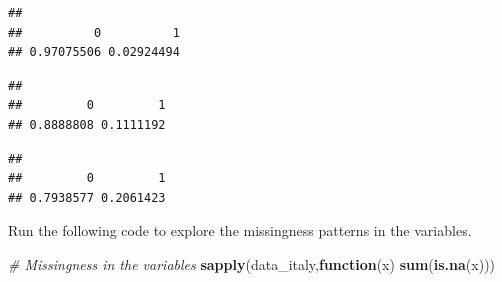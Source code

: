 \documentclass[]{article}
\newenvironment{Shaded}{\begin{snugshade}}{\end{snugshade}}
\newcommand{\CommentTok}[1]{\textcolor[rgb]{0.56,0.35,0.01}{\textit{#1}}}
\newcommand{\ControlFlowTok}[1]{\textcolor[rgb]{0.13,0.29,0.53}{\textbf{#1}}}
\newcommand{\KeywordTok}[1]{\textcolor[rgb]{0.13,0.29,0.53}{\textbf{#1}}}
\newcommand{\NormalTok}[1]{#1}
\newcommand{\OperatorTok}[1]{\textcolor[rgb]{0.81,0.36,0.00}{\textbf{#1}}}
\newcommand{\StringTok}[1]{\textcolor[rgb]{0.31,0.60,0.02}{#1}}
\begin{document}
\begin{Shaded}
\end{Shaded}

\begin{verbatim}
## 
##          0          1 
## 0.97075506 0.02924494
\end{verbatim}

\begin{Shaded}
\end{Shaded}

\begin{verbatim}
## 
##         0         1 
## 0.8888808 0.1111192
\end{verbatim}

\begin{Shaded}
\end{Shaded}

\begin{verbatim}
## 
##         0         1 
## 0.7938577 0.2061423
\end{verbatim}

Run the following code to explore the missingness patterns in the
variables.

\begin{Shaded}
\begin{Highlighting}[]
\CommentTok{# Missingness in the variables}
\KeywordTok{sapply}\NormalTok{(data_italy,}\ControlFlowTok{function}\NormalTok{(x) }\KeywordTok{sum}\NormalTok{(}\KeywordTok{is.na}\NormalTok{(x)))}
\end{Highlighting}
\end{Shaded}
\end{document}
